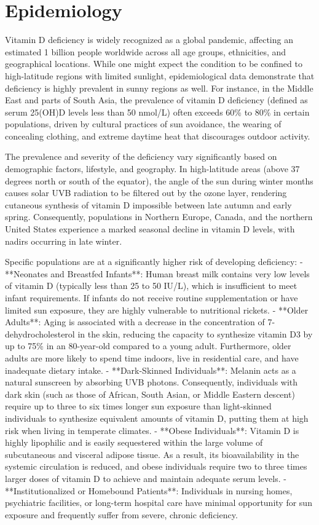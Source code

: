 \section*{Epidemiology}
Vitamin D deficiency is widely recognized as a global pandemic, affecting an estimated 1 billion people worldwide across all age groups, ethnicities, and geographical locations. While one might expect the condition to be confined to high-latitude regions with limited sunlight, epidemiological data demonstrate that deficiency is highly prevalent in sunny regions as well. For instance, in the Middle East and parts of South Asia, the prevalence of vitamin D deficiency (defined as serum 25(OH)D levels less than 50 nmol/L) often exceeds 60\% to 80\% in certain populations, driven by cultural practices of sun avoidance, the wearing of concealing clothing, and extreme daytime heat that discourages outdoor activity.

The prevalence and severity of the deficiency vary significantly based on demographic factors, lifestyle, and geography. In high-latitude areas (above 37 degrees north or south of the equator), the angle of the sun during winter months causes solar UVB radiation to be filtered out by the ozone layer, rendering cutaneous synthesis of vitamin D impossible between late autumn and early spring. Consequently, populations in Northern Europe, Canada, and the northern United States experience a marked seasonal decline in vitamin D levels, with nadirs occurring in late winter.

Specific populations are at a significantly higher risk of developing deficiency:
- **Neonates and Breastfed Infants**: Human breast milk contains very low levels of vitamin D (typically less than 25 to 50 IU/L), which is insufficient to meet infant requirements. If infants do not receive routine supplementation or have limited sun exposure, they are highly vulnerable to nutritional rickets.
- **Older Adults**: Aging is associated with a decrease in the concentration of 7-dehydrocholesterol in the skin, reducing the capacity to synthesize vitamin D3 by up to 75\% in an 80-year-old compared to a young adult. Furthermore, older adults are more likely to spend time indoors, live in residential care, and have inadequate dietary intake.
- **Dark-Skinned Individuals**: Melanin acts as a natural sunscreen by absorbing UVB photons. Consequently, individuals with dark skin (such as those of African, South Asian, or Middle Eastern descent) require up to three to six times longer sun exposure than light-skinned individuals to synthesize equivalent amounts of vitamin D, putting them at high risk when living in temperate climates.
- **Obese Individuals**: Vitamin D is highly lipophilic and is easily sequestered within the large volume of subcutaneous and visceral adipose tissue. As a result, its bioavailability in the systemic circulation is reduced, and obese individuals require two to three times larger doses of vitamin D to achieve and maintain adequate serum levels.
- **Institutionalized or Homebound Patients**: Individuals in nursing homes, psychiatric facilities, or long-term hospital care have minimal opportunity for sun exposure and frequently suffer from severe, chronic deficiency.

